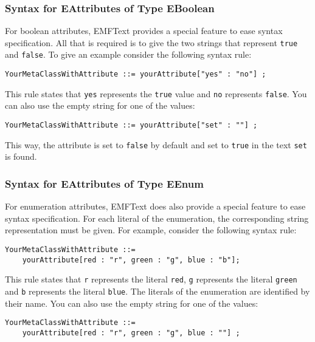 \subsubsection{Syntax for EAttributes of Type EBoolean}

For boolean attributes, EMFText provides a special feature to ease syntax
specification. All that is required is to give the two strings that represent
\texttt{true} and \texttt{false}. To give an example consider the following
syntax rule:

\lstset{language=CS}
\begin{lstlisting}
YourMetaClassWithAttribute ::= yourAttribute["yes" : "no"] ;
\end{lstlisting}

This rule states that \texttt{yes} represents the \texttt{true} value and
\texttt{no} represents \texttt{false}. You can also use the empty string for
one of the values:

\lstset{language=CS}
\begin{lstlisting}
YourMetaClassWithAttribute ::= yourAttribute["set" : ""] ;
\end{lstlisting}

This way, the attribute is set to \texttt{false} by default and set to
\texttt{true} in the text \texttt{set} is found.

\subsubsection{Syntax for EAttributes of Type EEnum}

For enumeration attributes, EMFText does also provide a special feature to ease
syntax specification. For each literal of the enumeration, the corresponding
string representation must be given. For example, consider the following
syntax rule:

\lstset{language=CS}
\begin{lstlisting}
YourMetaClassWithAttribute ::= 
    yourAttribute[red : "r", green : "g", blue : "b"];
\end{lstlisting}

This rule states that \texttt{r} represents the literal \texttt{red},
\texttt{g} represents the literal \texttt{green} and \texttt{b} represents the
literal \texttt{blue}. The literals of the enumeration are identified by their
name. You can also use the empty string for one of the values:

\lstset{language=CS}
\begin{lstlisting}
YourMetaClassWithAttribute ::= 
    yourAttribute[red : "r", green : "g", blue : ""] ;
\end{lstlisting}

